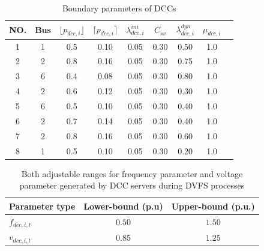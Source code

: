 \documentclass[lettersize,journal]{IEEEtran}
\begin{document}
\begin{table}[!t]
\centering
\caption{Boundary parameters of DCCs} \label{tab:dcc_params}
\begin{tabular}{c | c c c c c c c c}
\hline
{NO.} &
  {Bus} &
  $\lfloor p_{dcc,i} \rfloor$ &
  $\lceil p_{dcc,i} \rceil$ &
  $\lambda_{dcc,i}^{ini}$ &
  $C_{sv}$ &
  $\lambda_{dcc,i}^{dyn}$ &
  $\mu_{dcc,i}$ \\
\hline
1 & 1 & 0.5 & 0.10 & 0.05 & 0.30 & 0.50  & 1.0 \\
2 & 2 & 0.8 & 0.16 & 0.05 & 0.30 & 0.75  & 1.0 \\
3 & 6 & 0.4 & 0.08 & 0.05 & 0.30 & 0.80  & 1.0 \\
4 & 2 & 0.6 & 0.12 & 0.05 & 0.30 & 0.30  & 1.0 \\
5 & 6 & 0.5 & 0.10 & 0.05 & 0.30 & 0.40  & 1.0 \\
6 & 2 & 0.7 & 0.14 & 0.05 & 0.30 & 0.40  & 1.0 \\
7 & 2 & 0.8 & 0.16 & 0.05 & 0.30 & 0.60  & 1.0 \\
8 & 1 & 0.5 & 0.10 & 0.05 & 0.30 & 0.20  & 1.0 \\
\hline
\end{tabular}\vspace{-0.25cm}
\end{table}


\begin{table}[!t]
\centering
\caption{Both adjustable ranges for frequency parameter and voltage parameter generated by DCC servers during DVFS processes} \label{tab:dvfs_params}
\begin{tabular}{l|cc}
\hline
Parameter type & Lower-bound (p.u)  & Upper-bound (p.u.)   \\
\hline
\(f_{dcc,i,t}\)    & $0.50$  & $1.50$\\
\(v_{dcc,i,t}\)    & $0.85$ & $1.25$ \\
\hline
\end{tabular}\vspace{-0.05cm}
\end{table}
\end{document}
